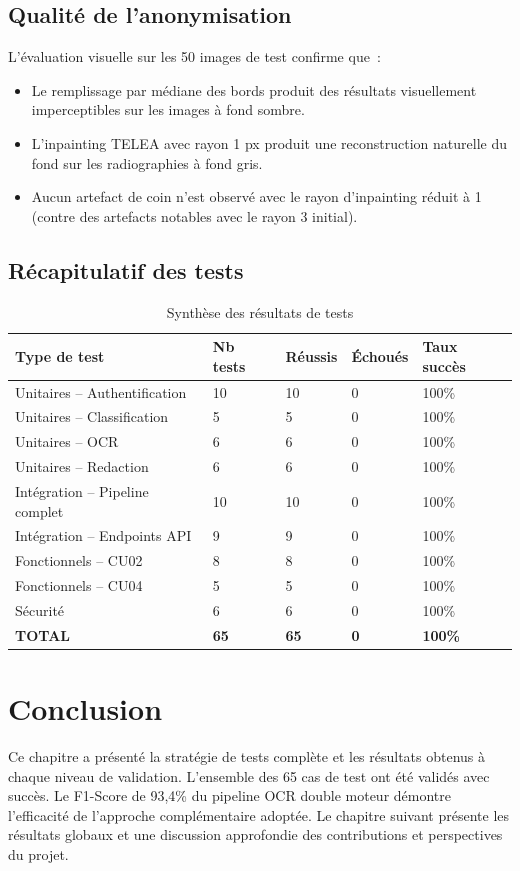 \subsection{Qualité de l'anonymisation}

L'évaluation visuelle sur les 50 images de test confirme que~:
\begin{itemize}
  \item Le remplissage par médiane des bords produit des résultats visuellement imperceptibles sur les images à fond sombre.
  \item L'inpainting TELEA avec rayon 1 px produit une reconstruction naturelle du fond sur les radiographies à fond gris.
  \item Aucun artefact de coin n'est observé avec le rayon d'inpainting réduit à 1 (contre des artefacts notables avec le rayon 3 initial).
\end{itemize}

\subsection{Récapitulatif des tests}

\begin{table}[H]
\centering
\caption{Synthèse des résultats de tests}
\label{tab:synthese_tests}
\begin{tabularx}{\textwidth}{X p{2cm} p{2cm} p{2cm} p{2.5cm}}
\toprule
\textbf{Type de test} & \textbf{Nb tests} & \textbf{Réussis} & \textbf{Échoués} & \textbf{Taux succès} \\
\midrule
Unitaires -- Authentification & 10 & 10 & 0 & 100\% \\
Unitaires -- Classification   & 5  & 5  & 0 & 100\% \\
Unitaires -- OCR              & 6  & 6  & 0 & 100\% \\
Unitaires -- Redaction        & 6  & 6  & 0 & 100\% \\
Intégration -- Pipeline complet & 10 & 10 & 0 & 100\% \\
Intégration -- Endpoints API  & 9  & 9  & 0 & 100\% \\
Fonctionnels -- CU02          & 8  & 8  & 0 & 100\% \\
Fonctionnels -- CU04          & 5  & 5  & 0 & 100\% \\
Sécurité                      & 6  & 6  & 0 & 100\% \\
\textbf{TOTAL}                & \textbf{65} & \textbf{65} & \textbf{0} & \textbf{100\%} \\
\bottomrule
\end{tabularx}
\end{table}

\section*{Conclusion}
Ce chapitre a présenté la stratégie de tests complète et les résultats obtenus à chaque niveau de validation. L'ensemble des 65 cas de test ont été validés avec succès. Le F1-Score de 93,4\% du pipeline OCR double moteur démontre l'efficacité de l'approche complémentaire adoptée. Le chapitre suivant présente les résultats globaux et une discussion approfondie des contributions et perspectives du projet.

